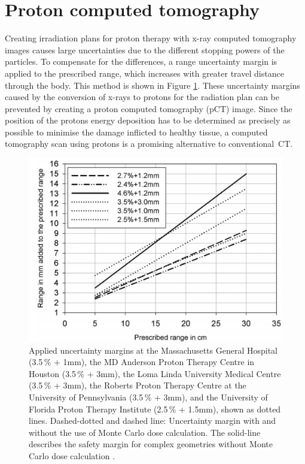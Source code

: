 \section{Proton computed tomography}
Creating irradiation plans for proton therapy with x-ray computed tomography images causes large uncertainties due to the different stopping powers of the particles.
To compensate for the differences, a range uncertainty margin is applied to the prescribed range, which increases with greater travel distance through the body. This
method is shown in Figure \ref{fig:paganetti}. These uncertainty margins caused by the conversion of x-rays to protons for the radiation plan can be prevented by creating a proton computed tomography (pCT) image.
Since the position of the protons energy deposition has to be determined as precisely as possible to minimise the damage inflicted to healthy tissue, a computed tomography scan using protons
is a promising alternative to \mbox{conventional CT}.

\begin{figure}
  \centering
  \includegraphics[height=0.5\textwidth]{images/prescription.png}
  \caption{Applied uncertainty margins at the Massachusetts General Hospital (3.5\,\% +
1mm), the MD Anderson Proton Therapy Centre in Houston (3.5\,\% + 3mm), the Loma Linda
University Medical Centre (3.5\,\% + 3mm), the Roberts Proton Therapy Centre at the
University of Pennsylvania (3.5\,\% + 3mm), and the University of Florida Proton Therapy
Institute (2.5\,\% + 1.5mm), shown as dotted lines. Dashed-dotted and dashed line: Uncertainty margin with and without the use of Monte Carlo dose calculation.
The solid-line describes the safety margin for complex geometries without Monte Carlo dose calculation \cite{paganetti}.}
  \label{fig:paganetti}
\end{figure}

